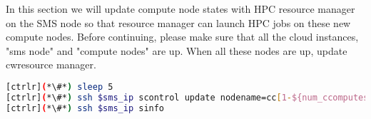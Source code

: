         In this section we will update compute node states with HPC resource manager on the SMS node so that resource manager can launch HPC jobs on these new compute nodes.
        Before continuing, please make sure that all the cloud instances, "sms node" and "compute nodes" are up. When all these nodes are up, update cwresource manager.



\begin{lstlisting}[language=bash,keywords={}]
[ctrlr](*\#*) sleep 5
[ctrlr](*\#*) ssh $sms_ip scontrol update nodename=cc[1-${num_ccomputes}] state=idle
[ctrlr](*\#*) ssh $sms_ip sinfo
\end{lstlisting}
